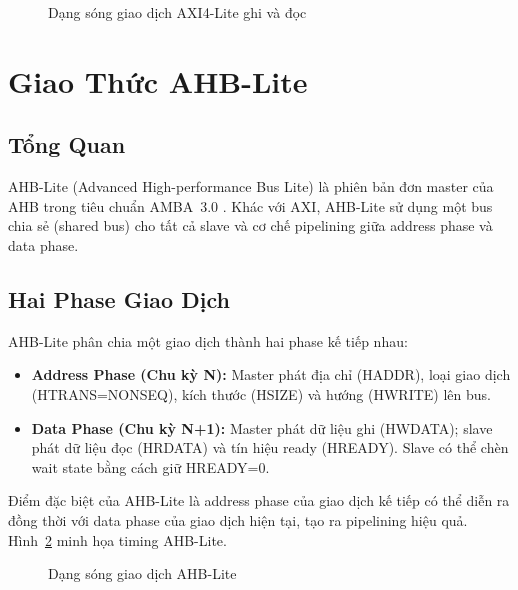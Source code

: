 \begin{figure}[htp]
\centering
{}
\caption{Dạng sóng giao dịch AXI4-Lite ghi và đọc}
\label{fig:axi-waveform}
\end{figure}

\section{Giao Thức AHB-Lite}

\subsection{Tổng Quan}

AHB-Lite (Advanced High-performance Bus Lite) là phiên bản đơn master của AHB trong tiêu chuẩn AMBA~3.0 \cite{amba-ahb-spec}. Khác với AXI, AHB-Lite sử dụng một bus chia sẻ (shared bus) cho tất cả slave và cơ chế pipelining giữa address phase và data phase.

\subsection{Hai Phase Giao Dịch}

AHB-Lite phân chia một giao dịch thành hai phase kế tiếp nhau:

\begin{itemize}
    \item \textbf{Address Phase (Chu kỳ N):} Master phát địa chỉ (HADDR), loại giao dịch (HTRANS=NONSEQ), kích thước (HSIZE) và hướng (HWRITE) lên bus.
    \item \textbf{Data Phase (Chu kỳ N+1):} Master phát dữ liệu ghi (HWDATA); slave phát dữ liệu đọc (HRDATA) và tín hiệu ready (HREADY). Slave có thể chèn wait state bằng cách giữ HREADY=0.
\end{itemize}

Điểm đặc biệt của AHB-Lite là address phase của giao dịch kế tiếp có thể diễn ra đồng thời với data phase của giao dịch hiện tại, tạo ra pipelining hiệu quả. Hình~\ref{fig:ahb-waveform} minh họa timing AHB-Lite.

\begin{figure}[htp]
\centering
{}
\caption{Dạng sóng giao dịch AHB-Lite}
\label{fig:ahb-waveform}
\end{figure}


